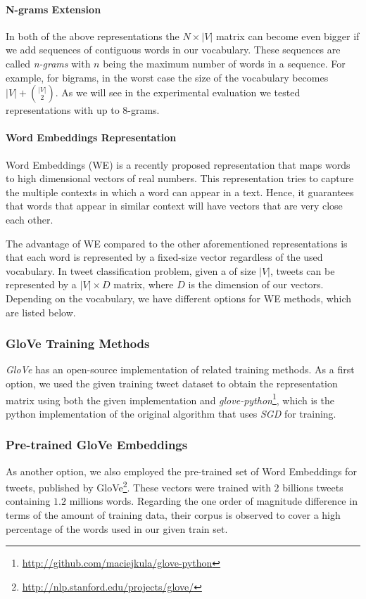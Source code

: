 \paragraph{\textbf{N-grams Extension}}
In both of the above representations the $N \times |V|$ matrix
can become even bigger if we add sequences of contiguous words in our vocabulary.
These sequences are called \textit{n-grams} with $n$ being the maximum number of words in a sequence.  
For example, for bigrams, in the worst case the size of the vocabulary becomes $|V| + {|V| \choose 2}$.
As we will see in the experimental evaluation we tested representations with up to 8-grams. 


\paragraph{\textbf{Word Embeddings Representation}}
Word Embeddings (WE) \cite{DBLP:journals/corr/MikolovSCCD13} is a recently proposed representation that maps words to high dimensional vectors of real numbers. 
This representation tries to capture the multiple contexts in which a word can appear in a text.
Hence, it guarantees that words that appear in similar context will have vectors that are very close each other.

The advantage of WE compared to the other aforementioned  representations is that each word is represented by a fixed-size vector regardless of the used vocabulary.
In tweet classification problem, given a of size $|V|$, tweets can be represented by a $|V| \times D$ matrix, where $D$ is the dimension of our vectors.
Depending on the vocabulary, we have different options for WE methods, which are listed below.

\subsubsection{GloVe Training Methods}
\textit{GloVe} \cite{pennington2014glove} has an open-source implementation of related training methods.
As a first option, we used the given training tweet dataset to obtain the representation matrix using both the given implementation and \textit{glove-python}\footnote{\url{http://github.com/maciejkula/glove-python}}, which is the python implementation of the original algorithm that uses \textit{SGD} for training.

\subsubsection{Pre-trained GloVe Embeddings}
As another option, we also employed the pre-trained set of Word Embeddings for tweets, published by GloVe\footnote{\url{http://nlp.stanford.edu/projects/glove/}}.
These vectors were trained with $2$ billions tweets containing $1.2$ millions words.
Regarding the one order of magnitude difference in terms of the amount of training data, their corpus is observed to cover a high percentage of the words used in our given train set.


